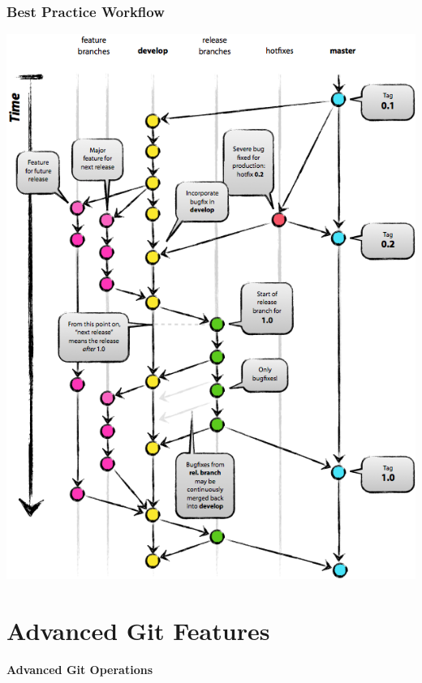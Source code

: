 \documentclass[18pt,mathserif]{beamer}
\begin{document}
\begin{frame}
	\frametitle{Best Practice Workflow}
	\includegraphics[height=\textheight]{images/master-develop-feature-branches.png}
\end{frame}


\section{Advanced Git Features}

\begin{frame}{}
  \begin{center}
    \huge\bfseries
    \textcolor{KITblack}{Advanced Git Operations}
  \end{center}
\end{frame}

\end{document}
